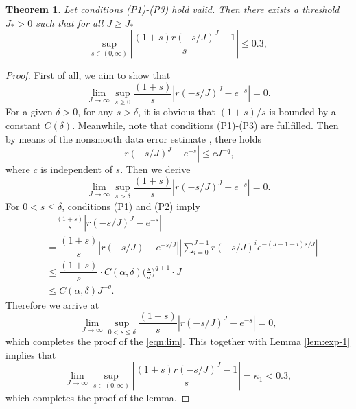 \documentclass[a4paper, oneside]{book}
\newtheorem{theorem}{Theorem}[section]
\begin{document}
\begin{theorem}\label{thm:conv-1}
Let conditions (P1)-(P3) hold valid. Then there exists a threshold $J_*>0$ such that
for all $J\ge J_*$
 \begin{equation*}
\sup_{s\in(0,\infty)}  \left|\frac{(1+s) r(-s/J)^J-1}{s}\right| \le 0.3,
\end{equation*}
        \end{theorem}
\begin{proof}
First of all, we aim to show that
 \begin{equation}\label{eqn:lim}
  \lim_{J\rightarrow\infty}\sup_{s\geq0}\frac{(1+s)}{s} \left|r(-s/J)^J-e^{- s}\right|=0.
  \end{equation}
For a given $\delta>0$, for any $s>\delta$,  it is obvious that $(1+s)/s$
is bounded by a constant $C(\delta)$. Meanwhile, note that
conditions (P1)-(P3) are fullfilled.
Then by means of the nonsmooth data error estimate \cite[Theorem 7.2]{Thomee:2006}, there holds
\begin{equation*}
\left|r(-s/J)^J-e^{-  s}\right| \le c J^{-q},
\end{equation*}
where $c$ is independent of $s$.
Then we derive
\begin{equation*}
\lim_{J\rightarrow\infty}\sup_{s> \delta}\frac{(1+s)}{s} \left|r(-s/J)^J-e^{-  s}\right|=0.
\end{equation*}
For $0 < s \leq\delta$, conditions (P1) and (P2) imply
\begin{equation*}
\begin{aligned}
   &\quad \frac{(1+s)}{s}   \left|r(-s/J)^J-e^{-  s}\right| \\
    &= \dfrac{(1+s)}{s}|r(-s/J)-e^{- s/J}|
    \left|\sum_{i=0}^{J-1} r(-s/J)^{i} e^{ -(J-1-i)  s/J}\right| \\
    &\leq \dfrac{(1+s)}{s} \cdot C(\alpha, \delta)\Big(\frac{s}{J}\Big)^{q+1} \cdot J \\
    &\leq C(\alpha, \delta) J^{-q}.
\end{aligned}
\end{equation*}
Therefore we arrive at
$$\lim_{J\to\infty}\sup_{0<s\leq\delta}\frac{(1+s)}{s} \left|r(-s/J)^{J} -e^{- s}\right|=0,$$
which completes the proof of the \eqref{eqn:lim}.
This together with Lemma \ref{lem:exp-1} implies that
    $$\lim_{J\to\infty}\sup_{s\in(0,\infty)}
    \left| \frac{(1+s)r(-s/J)^J-1}{s}  \right| = \kappa_1 < 0.3,$$
which completes the proof of the lemma.
\end{proof}
\end{document}
